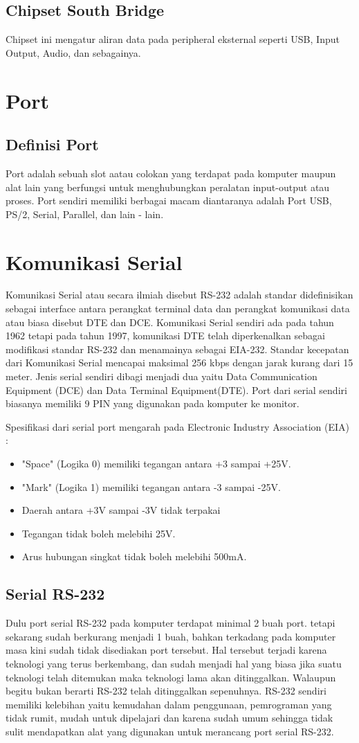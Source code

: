 \subsection{Chipset South Bridge}
Chipset ini mengatur aliran data pada peripheral eksternal seperti USB, Input Output, Audio, dan sebagainya.
\section{Port}
\subsection{Definisi Port}
Port adalah sebuah slot aatau colokan yang terdapat pada komputer maupun alat lain yang berfungsi untuk menghubungkan peralatan input-output atau proses. Port sendiri memiliki berbagai macam diantaranya adalah Port USB, PS/2, Serial, Parallel, dan lain - lain.
\section{Komunikasi Serial}
Komunikasi Serial atau secara ilmiah disebut RS-232 adalah standar didefinisikan sebagai interface antara perangkat terminal data dan perangkat komunikasi data atau biasa disebut DTE dan DCE. Komunikasi Serial sendiri ada pada tahun 1962 tetapi pada tahun 1997, komunikasi DTE telah diperkenalkan sebagai modifikasi standar RS-232 dan menamainya sebagai EIA-232.
Standar kecepatan dari Komunikasi Serial mencapai maksimal 256 kbps dengan jarak kurang dari 15 meter. Jenis serial sendiri dibagi menjadi dua yaitu Data Communication Equipment (DCE) dan Data Terminal Equipment(DTE). Port dari serial sendiri biasanya memiliki 9 PIN yang digunakan pada komputer ke monitor. 

Spesifikasi dari serial port mengarah pada Electronic Industry Association (EIA) : 
\begin{itemize}
\item "Space" (Logika 0) memiliki tegangan antara +3 sampai +25V.
\item "Mark" (Logika 1) memiliki tegangan antara -3 sampai -25V.
\item Daerah antara +3V sampai -3V tidak terpakai
\item Tegangan tidak boleh melebihi 25V.
\item Arus hubungan singkat tidak boleh melebihi 500mA.
\end{itemize}
\subsection{Serial RS-232}
Dulu port serial RS-232 pada komputer terdapat minimal 2 buah port. tetapi sekarang sudah berkurang menjadi 1 buah, bahkan terkadang pada komputer masa kini sudah tidak disediakan port tersebut. Hal tersebut terjadi karena teknologi yang terus berkembang, dan sudah menjadi hal yang biasa jika suatu teknologi telah ditemukan maka teknologi lama akan ditinggalkan. Walaupun begitu bukan berarti RS-232 telah ditinggalkan sepenuhnya. RS-232 sendiri memiliki kelebihan yaitu kemudahan dalam penggunaan, pemrograman yang tidak rumit, mudah untuk dipelajari dan karena sudah umum sehingga tidak sulit mendapatkan alat yang digunakan untuk merancang port serial RS-232.
